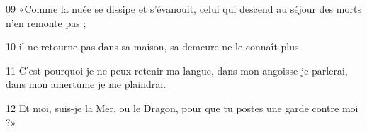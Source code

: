 
09 «Comme la nuée se dissipe et s’évanouit, celui qui descend au séjour des morts n’en remonte pas ;

10 il ne retourne pas dans sa maison, sa demeure ne le connaît plus.

11 C’est pourquoi je ne peux retenir ma langue, dans mon angoisse je parlerai, dans mon amertume je me plaindrai.

12 Et moi, suis-je la Mer, ou le Dragon, pour que tu postes une garde contre moi ?»